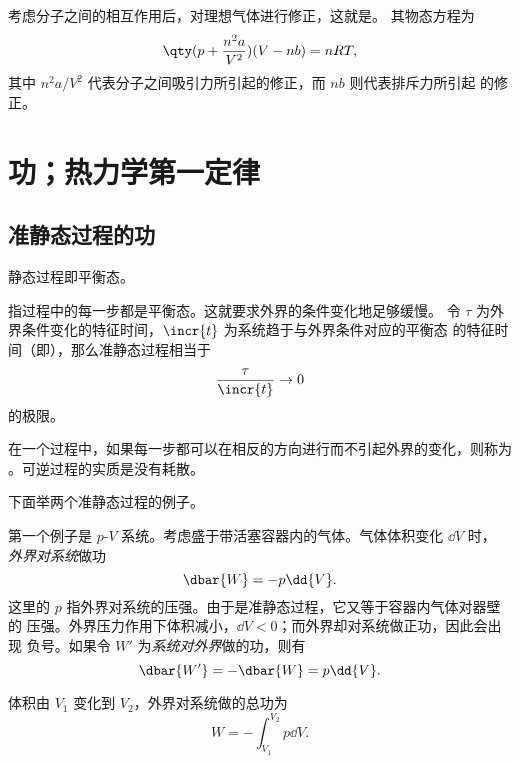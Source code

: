 考虑分子之间的相互作用后，对理想气体进行修正，这就是。
其物态方程为
\begin{equation} \label{eq:van-der-waals-gas}
  \qty(p + \frac{n^2 a}{V^2}) (V - nb) = nRT,
\end{equation}
其中 $n^2 a / V^2$ 代表分子之间吸引力所引起的修正，而 $nb$ 则代表排斥力所引起
的修正。

\section{功；热力学第一定律}

\subsection{准静态过程的功}

静态过程即平衡态。

指过程中的每一步都是平衡态。这就要求外界的条件变化地足够缓慢。
令 $\tau$ 为外界条件变化的特征时间，$\incr{t}$ 为系统趋于与外界条件对应的平衡态
的特征时间（即），那么准静态过程相当于
\begin{equation}
  \frac{\tau}{\incr{t}} \to 0
\end{equation}
的极限。

在一个过程中，如果每一步都可以在相反的方向进行而不引起外界的变化，则称为%
。可逆过程的实质是没有耗散。

下面举两个准静态过程的例子。

第一个例子是 $p$-$\!V$ 系统。考虑盛于带活塞容器内的气体。气体体积变化 $\dd{V}$ 时，
\emph{外界对系统}做功
\begin{equation}
  \dbar{W} = -p \dd{V}.
\end{equation}
这里的 $p$ 指外界对系统的压强。由于是准静态过程，它又等于容器内气体对器壁的
压强。外界压力作用下体积减小，$\dd{V} < 0$；而外界却对系统做正功，因此会出现
负号。如果令 $W'$ 为\emph{系统对外界}做的功，则有
\begin{equation}
  \dbar{W'} = - \dbar{W} = p \dd{V}.
\end{equation}

体积由 $V_1$ 变化到 $V_2$，外界对系统做的总功为
\begin{equation}
  W = -\int_{V_1}^{V_2} p \dd{V}.
\end{equation}

